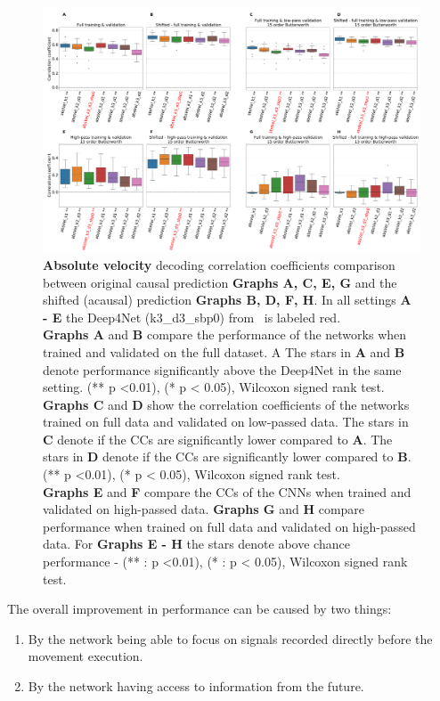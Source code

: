 \begin{figure}[!htbp]
   \includegraphics[width=1\linewidth]{img/ch4/original_vs_shifted_absVel_performance_comparison}
   \caption[Absolute velocity: non-shifted vs. shifted setting performances]{{\textbf{Absolute velocity} decoding correlation coefficients comparison between original causal prediction \textbf{Graphs A, C, E, G} and the shifted (acausal) prediction \textbf{Graphs B, D, F, H}. In all settings \textbf{
   A - E} the Deep4Net (k3\_d3\_sbp0) from~\cite{Hammer-2021} is labeled red.\\ \textbf{Graphs A} and \textbf{B} compare the performance of the networks when trained and validated on the full dataset. A The stars in \textbf{A} and \textbf{B} denote performance significantly above the Deep4Net in the same setting. (** p <0.01), (* p < 0.05), Wilcoxon signed rank test.
   \\\textbf{Graphs C} and \textbf{D} show the correlation coefficients of the networks trained on full data and validated on low-passed data. 
   The stars in \textbf{C} denote if the CCs are significantly lower compared to \textbf{A}. The stars in \textbf{D} denote if the CCs are significantly lower compared to \textbf{B}. (** p <0.01), (* p < 0.05), Wilcoxon signed rank test.
   \\\textbf{Graphs E} and \textbf{F} compare the CCs of the CNNs when trained and validated on high-passed data. \textbf{Graphs G} and \textbf{H} compare performance when trained on full data and validated on high-passed data. For \textbf{Graphs E - H} the stars denote above chance performance - (** : p <0.01), (* : p < 0.05), Wilcoxon signed rank test.}}
   \label{fig:shifted-performance-absVel}
\end{figure}
\clearpage
The overall improvement in performance can be caused by two things:
\begin{enumerate}
    \item By the network being able to focus on signals recorded directly before the movement execution.
    \item By the network having access to information from the future.
\end{enumerate}

